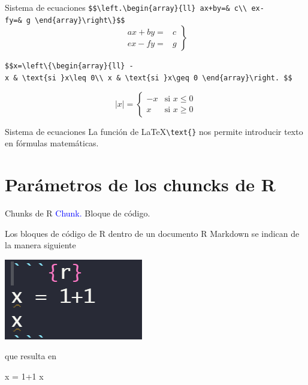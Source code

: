 \documentclass[
  ignorenonframetext,
  aspectratio=169]{beamer}
\newenvironment{Shaded}{\begin{snugshade}}{\end{snugshade}}
\newcommand{\DecValTok}[1]{\textcolor[rgb]{0.00,0.00,0.81}{#1}}
\newcommand{\NormalTok}[1]{#1}
\newcommand{\OtherTok}[1]{\textcolor[rgb]{0.56,0.35,0.01}{#1}}
\newcommand{\SpecialCharTok}[1]{\textcolor[rgb]{0.00,0.00,0.00}{#1}}
\let\oldverbatim\verbatim
\let\endoldverbatim\endverbatim
\renewenvironment{verbatim}{\tiny\oldverbatim}{\endoldverbatim}
\newcommand\blue[1]{\textcolor{blue}{#1}}
\begin{document}
\begin{frame}[fragile]{Sistema de ecuaciones}
\protect\hypertarget{sistema-de-ecuaciones-1}{}
\texttt{\$\$\textbackslash{}left.\textbackslash{}begin\{array\}\{ll\}\ ax+by=\&\ c\textbackslash{}\textbackslash{}\ ex-fy=\&\ g\ \textbackslash{}end\{array\}\textbackslash{}right\textbackslash{}\}\$\$}
\[\left.\begin{array}{ll}
ax+by=& c\\
ex-fy=& g
\end{array}\right\}\]

\texttt{\$\$\textbar{}x\textbar{}=\textbackslash{}left\textbackslash{}\{\textbackslash{}begin\{array\}\{ll\}\ -x\ \&\ \textbackslash{}text\{si\ \}x\textbackslash{}leq\ 0\textbackslash{}\textbackslash{}\ x\ \&\ \textbackslash{}text\{si\ \}x\textbackslash{}geq\ 0\ \textbackslash{}end\{array\}\textbackslash{}right.\ \$\$}

\[|x|=\left\{\begin{array}{ll}
-x & \text{si }x\leq 0\\
x & \text{si }x\geq 0
\end{array}\right.\]
\end{frame}

\begin{frame}[fragile]{Sistema de ecuaciones}
\protect\hypertarget{sistema-de-ecuaciones-2}{}
La función de \LaTeX \texttt{\textbackslash{}text\{\}} nos permite
introducir texto en fórmulas matemáticas.
\end{frame}

\hypertarget{paruxe1metros-de-los-chuncks-de-r}{%
\section{Parámetros de los chuncks de
R}\label{paruxe1metros-de-los-chuncks-de-r}}

\begin{frame}[fragile]{Chunks de R}
\protect\hypertarget{chunks-de-r}{}
\blue{Chunk.} Bloque de código.

Los bloques de código de R dentro de un documento R Markdown se indican
de la manera siguiente

\includegraphics[width=0.15\linewidth]{Imgs/chunk_00}

que resulta en

\begin{Shaded}
\begin{Highlighting}[]
\NormalTok{x }\OtherTok{=} \DecValTok{1}\SpecialCharTok{+}\DecValTok{1}
\NormalTok{x}
\end{Highlighting}
\end{Shaded}

\begin{verbatim}
[1] 2
\end{verbatim}
\end{frame}
\end{document}
